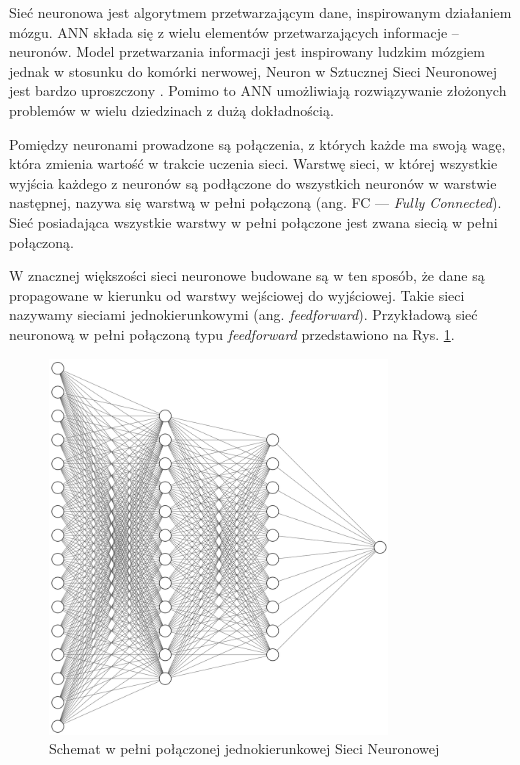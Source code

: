 Sieć neuronowa jest algorytmem przetwarzającym dane, inspirowanym działaniem mózgu. ANN składa się z wielu elementów przetwarzających informacje -- neuronów. Model przetwarzania informacji jest inspirowany ludzkim mózgiem jednak w stosunku do komórki nerwowej, Neuron w Sztucznej Sieci Neuronowej jest bardzo uproszczony
\cite{tadeusiewicz1993sieci}. Pomimo to ANN umożliwiają rozwiązywanie złożonych
problemów w wielu dziedzinach z dużą dokładnością.

Pomiędzy neuronami prowadzone są połączenia, z których każde ma swoją wagę, która 
zmienia wartość w trakcie uczenia sieci. Warstwę sieci, w której wszystkie wyjścia każdego z neuronów są podłączone do wszystkich neuronów w warstwie następnej, nazywa się warstwą w pełni połączoną (ang. FC — \emph{Fully Connected}).
Sieć posiadająca wszystkie warstwy w pełni połączone jest zwana siecią w pełni połączoną. 

W znacznej większości sieci neuronowe budowane są w ten sposób, że dane są propagowane w kierunku od warstwy wejściowej do wyjściowej. Takie sieci nazywamy sieciami jednokierunkowymi (ang. \emph{feedforward}). Przykładową sieć neuronową w pełni połączoną typu \emph{feedforward} przedstawiono na Rys. \ref{ann-img}.
\bigskip

\begin{figure}[h]
  \centering
  \includegraphics[width=0.8\textwidth]{img/ann.png}
  \caption{Schemat w pełni połączonej jednokierunkowej Sieci Neuronowej}
  \label{ann-img}
\end{figure}


